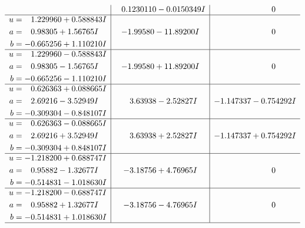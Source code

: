 \documentclass[1p]{elsarticle_modified}
\theoremstyle{definition}
\begin{document}
$$\begin{array}{c|c|c}
 & \phantom{-}0.1230110 - 0.0150349 I & \phantom{-0.000000 } 0 \\ \hline\begin{aligned}
u &= \phantom{-}1.229960 + 0.588843 I \\
a &= \phantom{-}0.98305 + 1.56765 I \\
b &= -0.665256 + 1.110210 I\end{aligned}
 & -1.99580 - 11.89200 I & \phantom{-0.000000 } 0 \\ \hline\begin{aligned}
u &= \phantom{-}1.229960 - 0.588843 I \\
a &= \phantom{-}0.98305 - 1.56765 I \\
b &= -0.665256 - 1.110210 I\end{aligned}
 & -1.99580 + 11.89200 I & \phantom{-0.000000 } 0 \\ \hline\begin{aligned}
u &= \phantom{-}0.626363 + 0.088665 I \\
a &= \phantom{-}2.69216 - 3.52949 I \\
b &= -0.309304 - 0.848107 I\end{aligned}
 & \phantom{-}3.63938 - 2.52827 I & -1.147337 - 0.754292 I \\ \hline\begin{aligned}
u &= \phantom{-}0.626363 - 0.088665 I \\
a &= \phantom{-}2.69216 + 3.52949 I \\
b &= -0.309304 + 0.848107 I\end{aligned}
 & \phantom{-}3.63938 + 2.52827 I & -1.147337 + 0.754292 I \\ \hline\begin{aligned}
u &= -1.218200 + 0.688747 I \\
a &= \phantom{-}0.95882 - 1.32677 I \\
b &= -0.514831 - 1.018630 I\end{aligned}
 & -3.18756 + 4.76965 I & \phantom{-0.000000 } 0 \\ \hline\begin{aligned}
u &= -1.218200 - 0.688747 I \\
a &= \phantom{-}0.95882 + 1.32677 I \\
b &= -0.514831 + 1.018630 I\end{aligned}
 & -3.18756 - 4.76965 I & \phantom{-0.000000 } 0\\
 \hline 
 \end{array}$$\newpage$$\begin{array}{c|c|c}  

\end{array}$$
\end{document}
